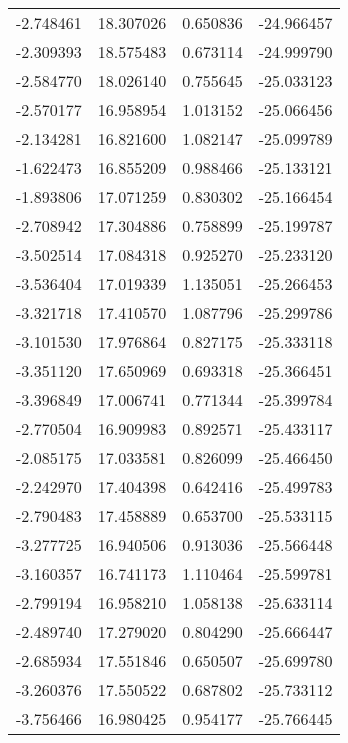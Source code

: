 \begin{tabular}{rrrr}
       -2.748461 &        18.307026 &    0.650836 & -24.966457 \\
       -2.309393 &        18.575483 &    0.673114 & -24.999790 \\
       -2.584770 &        18.026140 &    0.755645 & -25.033123 \\
       -2.570177 &        16.958954 &    1.013152 & -25.066456 \\
       -2.134281 &        16.821600 &    1.082147 & -25.099789 \\
       -1.622473 &        16.855209 &    0.988466 & -25.133121 \\
       -1.893806 &        17.071259 &    0.830302 & -25.166454 \\
       -2.708942 &        17.304886 &    0.758899 & -25.199787 \\
       -3.502514 &        17.084318 &    0.925270 & -25.233120 \\
       -3.536404 &        17.019339 &    1.135051 & -25.266453 \\
       -3.321718 &        17.410570 &    1.087796 & -25.299786 \\
       -3.101530 &        17.976864 &    0.827175 & -25.333118 \\
       -3.351120 &        17.650969 &    0.693318 & -25.366451 \\
       -3.396849 &        17.006741 &    0.771344 & -25.399784 \\
       -2.770504 &        16.909983 &    0.892571 & -25.433117 \\
       -2.085175 &        17.033581 &    0.826099 & -25.466450 \\
       -2.242970 &        17.404398 &    0.642416 & -25.499783 \\
       -2.790483 &        17.458889 &    0.653700 & -25.533115 \\
       -3.277725 &        16.940506 &    0.913036 & -25.566448 \\
       -3.160357 &        16.741173 &    1.110464 & -25.599781 \\
       -2.799194 &        16.958210 &    1.058138 & -25.633114 \\
       -2.489740 &        17.279020 &    0.804290 & -25.666447 \\
       -2.685934 &        17.551846 &    0.650507 & -25.699780 \\
       -3.260376 &        17.550522 &    0.687802 & -25.733112 \\
       -3.756466 &        16.980425 &    0.954177 & -25.766445 \\

\end{tabular}
